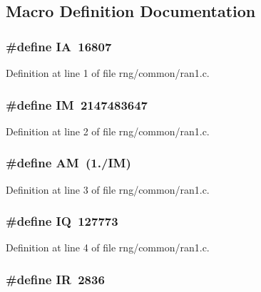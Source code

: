 \subsection{Macro Definition Documentation}
\subsubsection[{I\-A}]{\setlength{\rightskip}{0pt plus 5cm}\#define I\-A~16807}\label{rng_2common_2ran1_8c_ae4b0efde4fa4613b407716d265d19b0a}


Definition at line 1 of file rng/common/ran1.\-c.

\subsubsection[{I\-M}]{\setlength{\rightskip}{0pt plus 5cm}\#define I\-M~2147483647}\label{rng_2common_2ran1_8c_a51c0dfe766601d31e907fceae818a7ca}


Definition at line 2 of file rng/common/ran1.\-c.

\subsubsection[{A\-M}]{\setlength{\rightskip}{0pt plus 5cm}\#define A\-M~(1./{\bf I\-M})}\label{rng_2common_2ran1_8c_ad301e6a88b1c01108f4867f2ea6f683c}


Definition at line 3 of file rng/common/ran1.\-c.

\subsubsection[{I\-Q}]{\setlength{\rightskip}{0pt plus 5cm}\#define I\-Q~127773}\label{rng_2common_2ran1_8c_ab7c5f3342853af6bb48d0ca00b05efbe}


Definition at line 4 of file rng/common/ran1.\-c.

\subsubsection[{I\-R}]{\setlength{\rightskip}{0pt plus 5cm}\#define I\-R~2836}\label{rng_2common_2ran1_8c_a68e22635ff207d8ca10459833856bd75}


